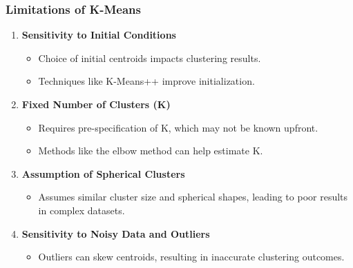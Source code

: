 \documentclass[aspectratio=169]{beamer}
\begin{document}
\begin{frame}[fragile]
    \frametitle{Limitations of K-Means}
    \begin{enumerate}
        \item \textbf{Sensitivity to Initial Conditions}
        \begin{itemize}
            \item Choice of initial centroids impacts clustering results.
            \item Techniques like K-Means++ improve initialization.
        \end{itemize}
        
        \item \textbf{Fixed Number of Clusters (K)}
        \begin{itemize}
            \item Requires pre-specification of K, which may not be known upfront.
            \item Methods like the elbow method can help estimate K.
        \end{itemize}
        
        \item \textbf{Assumption of Spherical Clusters}
        \begin{itemize}
            \item Assumes similar cluster size and spherical shapes, leading to poor results in complex datasets.
        \end{itemize}
        
        \item \textbf{Sensitivity to Noisy Data and Outliers}
        \begin{itemize}
            \item Outliers can skew centroids, resulting in inaccurate clustering outcomes.
        \end{itemize}
    \end{enumerate}
\end{frame}
\end{document}
